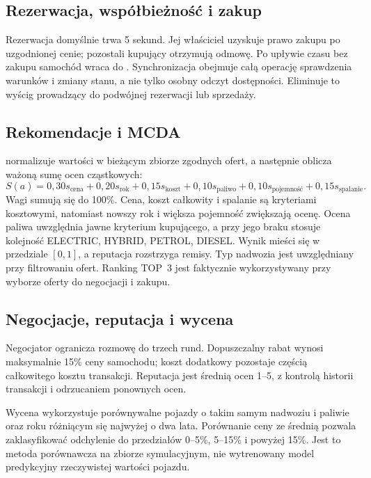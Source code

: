 \documentclass[a4paper,11pt]{uzreport}
\newcommand{\code}[1]{\texttt{\detokenize{#1}}}
\begin{document}
\subsection{Rezerwacja, współbieżność i zakup}
Rezerwacja domyślnie trwa 5 sekund. Jej właściciel uzyskuje prawo
zakupu po uzgodnionej cenie; pozostali kupujący otrzymują odmowę.
Po upływie czasu bez zakupu samochód wraca do \code{AVAILABLE}.
Synchronizacja obejmuje całą operację sprawdzenia warunków i zmiany stanu,
a nie tylko osobny odczyt dostępności. Eliminuje to wyścig prowadzący
do podwójnej rezerwacji lub sprzedaży.



\subsection{Rekomendacje i MCDA}
\code{RecommendationService} normalizuje wartości w bieżącym zbiorze
zgodnych ofert, a następnie oblicza ważoną sumę ocen cząstkowych:
\[
 S(a)=0{,}30s_{\mathrm{cena}}+
 0{,}20s_{\mathrm{rok}}+
 0{,}15s_{\mathrm{koszt}}+
 0{,}10s_{\mathrm{paliwo}}+
 0{,}10s_{\text{pojemność}}+
 0{,}15s_{\mathrm{spalanie}}.
\]
Wagi sumują się do 100\%. Cena, koszt całkowity i spalanie są kryteriami
kosztowymi, natomiast nowszy rok i większa pojemność zwiększają ocenę.
Ocena paliwa uwzględnia jawne kryterium kupującego, a przy jego braku
stosuje kolejność ELECTRIC, HYBRID, PETROL, DIESEL.
Wynik mieści się w przedziale $[0,1]$,
a reputacja rozstrzyga remisy. Typ nadwozia jest uwzględniany przy
filtrowaniu ofert. Ranking TOP~3 jest faktycznie wykorzystywany przy wyborze
oferty do negocjacji i zakupu.

\subsection{Negocjacje, reputacja i wycena}
Negocjator ogranicza rozmowę do trzech rund. Dopuszczalny rabat wynosi
maksymalnie 15\% ceny samochodu; koszt dodatkowy pozostaje częścią
całkowitego kosztu transakcji. Reputacja jest średnią ocen 1--5,
z kontrolą historii transakcji i odrzucaniem ponownych ocen.

Wycena wykorzystuje porównywalne pojazdy o takim samym nadwoziu i paliwie
oraz roku różniącym się najwyżej o dwa lata. Porównanie ceny ze średnią
pozwala zaklasyfikować odchylenie do przedziałów 0--5\%, 5--15\%
i powyżej 15\%. Jest to metoda porównawcza na zbiorze symulacyjnym,
nie wytrenowany model predykcyjny rzeczywistej wartości pojazdu.
\end{document}
